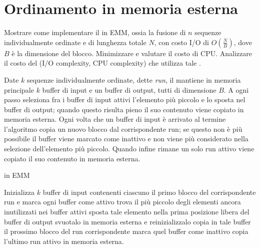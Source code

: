 \chapter{Ordinamento in memoria esterna}

\begin{problem*}
    Mostrare come implementare il \kwaymerge in EMM, ossia la fusione di
    \(n\) sequenze individualmente ordinate e di lunghezza totale \(N\), con
    costo I/O di \(O\left(\frac{N}{B}\right)\), dove \(B\) \`e la dimensione 
    del blocco. Minimizzare e valutare il costo di CPU. Analizzare il costo 
    del \mergesort (I/O complexity, CPU complexity) che utilizza tale 
    \kwaymerge.
\end{problem*}

Date \(k\) sequenze individualmente ordinate, dette \emph{run}, il \kwaymerge 
mantiene in memoria principale \(k\) buffer di input e un buffer di 
output, tutti di dimensione \(B\). A ogni passo seleziona fra i buffer di 
input attivi l'elemento pi\`u piccolo e lo sposta nel buffer di output; 
quando questo risulta pieno il suo contenuto viene copiato in memoria 
esterna. Ogni volta che un buffer di input \`e arrivato al termine 
l'algoritmo copia un nuovo blocco dal corrispondente run; se questo non \`e 
pi\`u possibile il buffer viene marcato come inattivo e non viene pi\`u 
considerato nella selezione dell'elemento pi\`u piccolo. Quando infine rimane 
un solo run attivo viene copiato il suo contenuto in memoria esterna.

\begin{algorithm}
  \caption{\kwaymerge in EMM}
  \begin{algorithmic}[1]
    \State Inizializza \(k\) buffer di input contenenti ciascuno il primo 
    blocco del corrispondente run e marca ogni buffer come attivo
      \State trova il pi\`u piccolo degli elementi ancora inutilizzati nei 
      buffer attivi
      \State sposta tale elemento nella prima posizione libera del buffer di 
      output
        \State svuotalo in memoria esterna e reinizializzalo
      \EndIf
        \State copia in tale buffer il prossimo blocco del run corrispondente
          \State marca quel buffer come inattivo
        \EndIf
      \EndIf
    \EndWhile
    \State copia l'ultimo run attivo in memoria esterna.
  \end{algorithmic}	
\end{algorithm}

